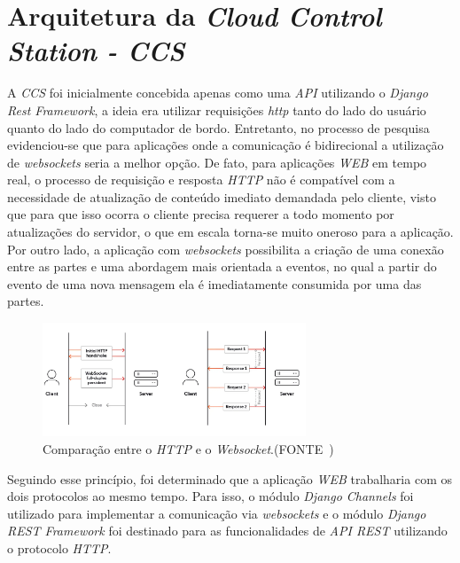 \documentclass[12pt,a4paper,oneside]{book}
\begin{document}
\section{Arquitetura da \textit{Cloud Control Station - CCS}}

A \textit{CCS} foi inicialmente concebida apenas como uma \textit{API} utilizando o \textit{Django Rest Framework}, a ideia era utilizar requisições \textit{http} tanto do lado do usuário quanto do lado do computador de bordo. Entretanto, no processo de pesquisa evidenciou-se que para aplicações onde a comunicação é bidirecional a utilização de \textit{websockets} seria a melhor opção. De fato, para aplicações \textit{WEB} em tempo real, o processo de requisição e resposta \textit{HTTP} não é compatível com a necessidade de atualização de conteúdo imediato demandada pelo cliente, visto que para que isso ocorra o cliente precisa requerer a todo momento por atualizações do servidor, o que em escala torna-se muito oneroso para a aplicação. Por outro lado, a aplicação com \textit{websockets} possibilita a criação de uma conexão entre as partes e uma abordagem mais orientada a eventos, no qual a partir do evento de uma nova mensagem ela é imediatamente consumida por uma das partes.

%
\begin{figure}[H]
  \centering
  \includegraphics[width=0.7\textwidth]{Images/Diagramas/http-long-polling.png}
  \caption{Comparação entre o \textit{HTTP} e o \textit{Websocket}.(FONTE~\cite{url:websocket_vs_http})}
  \label{fig:http-long-polling.png.0}
\end{figure}
%

Seguindo esse princípio, foi determinado que a aplicação \textit{WEB} trabalharia com os dois protocolos ao mesmo tempo. Para isso, o módulo \textit{Django Channels} foi utilizado para implementar a comunicação via \textit{websockets} e o módulo \textit{Django REST Framework} foi destinado para as funcionalidades de \textit{API REST} utilizando o protocolo \textit{HTTP}.
\end{document}
